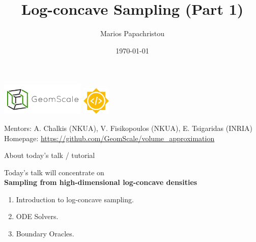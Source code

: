 \documentclass{beamer}
\title{Log-concave Sampling (Part 1)}
\author{Marios Papachristou}
\institute{GeomScale, NTUA}
\date{\today}
\begin{document}
\begin{frame}
    \titlepage
    \begin{center}
        \includegraphics[width=0.3\textwidth]{publications/presentations/log_concave_sampling/logo.png} \quad 
        \includegraphics[width=0.1\textwidth]{publications/presentations/log_concave_sampling/gsoc.png} 
    \end{center}
    
    \small {
    Mentors: A. Chalkis (NKUA), V. Fisikopoulos (NKUA), E. Tsigaridas (INRIA) \\
    Homepage: \url{https://github.com/GeomScale/volume_approximation}
    }
\end{frame}


\begin{frame}{About today's talk / tutorial}

Today's talk will concentrate on 
\\
\textbf{Sampling from high-dimensional log-concave densities}

\begin{enumerate}
    \item Introduction to log-concave sampling.
    \item ODE Solvers.
    \item Boundary Oracles.
\end{enumerate}


\end{frame}
\end{document}
